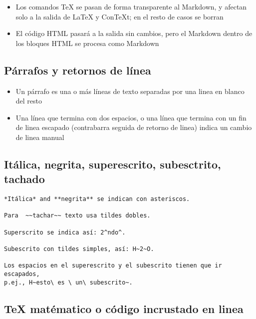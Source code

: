 \documentclass[12pt,es-ES,]{article}
\begin{document}
\begin{itemize}
\itemsep1pt\parskip0pt
\item
  Los comandos TeX se pasan de forma transparente al Markdown, y afectan
  solo a la salida de LaTeX y ConTeXt; en el resto de casos se borran
\item
  El código HTML pasará a la salida sin cambios, pero el Markdown dentro
  de los bloques HTML se procesa como Markdown
\end{itemize}

\subsection{Párrafos y retornos de
línea}\label{puxe1rrafos-y-retornos-de-luxednea}

\begin{itemize}
\itemsep1pt\parskip0pt
\item
  Un párrafo es una o más líneas de texto separadas por una linea en
  blanco del resto
\item
  Una línea que termina con dos espacios, o una línea que termina con un
  fin de linea escapado (contrabarra seguida de retorno de linea) indica
  un cambio de linea manual
\end{itemize}

\subsection{Itálica, negrita, superescrito, subesctrito,
tachado}\label{ituxe1lica-negrita-superescrito-subesctrito-tachado}

\begin{verbatim}
*Itálica* and **negrita** se indican con asteriscos.

Para  ~~tachar~~ texto usa tildes dobles.

Superscrito se indica así: 2^ndo^.

Subescrito con tildes simples, así: H~2~O.

Los espacios en el superescrito y el subescrito tienen que ir escapados,
p.ej., H~esto\ es \ un\ subescrito~.
\end{verbatim}

\subsection{TeX matématico o código incrustado en
linea}\label{tex-matuxe9matico-o-cuxf3digo-incrustado-en-linea}
\end{document}
